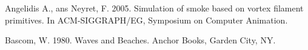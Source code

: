 \begin{thebibliography}{99}

 Angelidis A., ans Neyret, F. 2005. Simulation of smoke based on vortex filament primitives. In ACM-SIGGRAPH/EG, Symposium on Computer Animation.

 Bascom, W. 1980. Waves and Beaches. Anchor Books, Garden City, NY.

\end{thebibliography}
